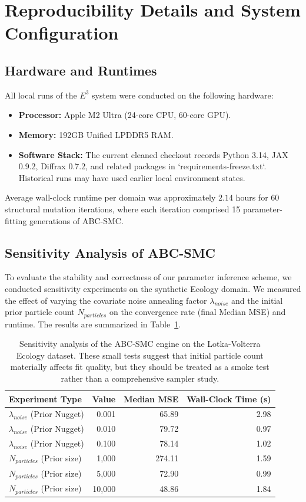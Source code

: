 \appendix
\section{Reproducibility Details and System Configuration}
\label{sec:appendix_repro}

\subsection{Hardware and Runtimes}
All local runs of the $E^3$ system were conducted on the following hardware:
\begin{itemize}
    \item \textbf{Processor:} Apple M2 Ultra (24-core CPU, 60-core GPU).
    \item \textbf{Memory:} 192GB Unified LPDDR5 RAM.
    \item \textbf{Software Stack:} The current cleaned checkout records Python 3.14, JAX 0.9.2, Diffrax 0.7.2, and related packages in `requirements-freeze.txt`. Historical runs may have used earlier local environment states.
\end{itemize}

Average wall-clock runtime per domain was approximately $2.14$ hours for 60 structural mutation iterations, where each iteration comprised 15 parameter-fitting generations of ABC-SMC.

\subsection{Sensitivity Analysis of ABC-SMC}
To evaluate the stability and correctness of our parameter inference scheme, we conducted sensitivity experiments on the synthetic Ecology domain. We measured the effect of varying the covariate noise annealing factor $\lambda_{noise}$ and the initial prior particle count $N_{particles}$ on the convergence rate (final Median MSE) and runtime. The results are summarized in Table~\ref{tab:sensitivity}.

\begin{table}[ht]
\centering
\begin{tabular}{lrrr}
\toprule
\textbf{Experiment Type} & \textbf{Value} & \textbf{Median MSE} & \textbf{Wall-Clock Time (s)} \\
\midrule
$\lambda_{noise}$ (Prior Nugget) & 0.001 & 65.89 & 2.98 \\
$\lambda_{noise}$ (Prior Nugget) & 0.010 & 79.72 & 0.97 \\
$\lambda_{noise}$ (Prior Nugget) & 0.100 & 78.14 & 1.02 \\
\midrule
$N_{particles}$ (Prior size)     & 1,000  & 274.11 & 1.59 \\
$N_{particles}$ (Prior size)     & 5,000  & 72.90  & 0.99 \\
$N_{particles}$ (Prior size)     & 10,000 & 48.86  & 1.84 \\
\bottomrule
\end{tabular}
\caption{Sensitivity analysis of the ABC-SMC engine on the Lotka-Volterra Ecology dataset. These small tests suggest that initial particle count materially affects fit quality, but they should be treated as a smoke test rather than a comprehensive sampler study.}
\label{tab:sensitivity}
\end{table}
